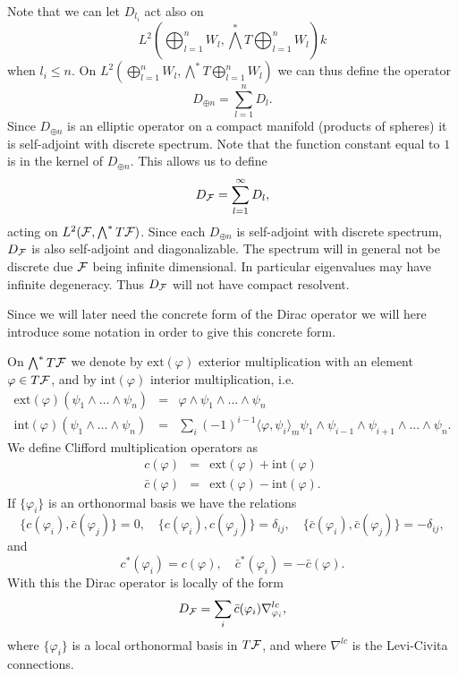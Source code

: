 \documentclass[letterpaper,11pt]{article}
\def\cf{{\cal F}}
\newcommand{\cF}{{\cal F}}
\begin{document}
Note that we can  let $D_{l_i}$ act also on   $$L^2 (\bigoplus_{l=1}^nW_l, \bigwedge^* T\bigoplus_{l=1}^n W_l)k$$ when $l_i\leq n$.   
On 
$L^2 (\bigoplus_{l=1}^nW_l, \bigwedge^* T\bigoplus_{l=1}^n W_l)$
we can thus define the operator
$$D_{\oplus n} =\sum_{{l=1}}^n D_l .$$
Since $D_{\oplus n}$ is an elliptic operator on a compact manifold (products of spheres) it is self-adjoint with discrete spectrum.     Note that the function constant equal to $1$ is in the kernel of $D_{\oplus n}$. This allows us to define 
$$D_\cf= \sum_{{l=1}}^\infty D_l ,$$
acting on $L^2(\cF ,\bigwedge^* T\cF)$. Since each  $D_{\oplus n}$ is self-adjoint with discrete spectrum, $D_\cf$ is also self-adjoint and diagonalizable. The spectrum will in general not be discrete due $\cf$ being infinite dimensional.  In particular eigenvalues may have infinite degeneracy.  
Thus $D_\cf$  will not have compact resolvent.



Since we will later need the concrete form of the Dirac operator we will here introduce some notation in order to give this concrete form. 

On $\bigwedge^*T\cF$ we denote by $\mbox{ext} (\varphi)$ exterior multiplication with an element $\varphi \in T\cF$, and by $\mbox{int} (\varphi )$ interior multiplication, i.e.
\begin{eqnarray*}
\mbox{ext} (\varphi )(\psi_1\wedge \ldots \wedge \psi_n)&=& \varphi \wedge \psi_1 \wedge  \ldots \wedge \psi_n \\
\mbox{int} (\varphi )(\psi_1\wedge \ldots \wedge \psi_n)&=&\sum_i(-1)^{i-1} \langle  \varphi, \psi_i\rangle_m \psi_1\wedge \psi_{i-1}\wedge \psi_{i+1}\wedge \ldots \wedge \psi_n .
\end{eqnarray*}
We define Clifford multiplication operators as 
\begin{eqnarray*}
c(\varphi ) &= &\mbox{ext} (\varphi) +\mbox{int} ( \varphi ) \\
\bar{c}(\varphi ) &= &\mbox{ext} (\varphi) -\mbox{int} ( \varphi ) . 
\end{eqnarray*}
If $\{\varphi_i \}$ is an orthonormal basis we have the relations 
$$ \{c(\varphi_i  ),\bar{c}(\varphi_j  )  \}=0, \quad \{c(\varphi_i  ),c(\varphi_j  )  \}=\delta_{ij}, \quad \{\bar{c}(\varphi_i  ),\bar{c}(\varphi_j  )  \}=-\delta_{ij} ,$$
and 
$$c^*(\varphi_i)=c(\varphi), \quad \bar{c}^*(\varphi_i)=-\bar{c}(\varphi) .$$
With this the Dirac operator is locally of the form
$$D_\cf =\sum_{i} \bar{c}(\varphi_i) \nabla_{\varphi_i}^{lc} , $$
where $\{\varphi_i \}$ is a local orthonormal basis in $T\cf$, and where $\nabla^{lc}$ is the Levi-Civita connections.
\end{document}
